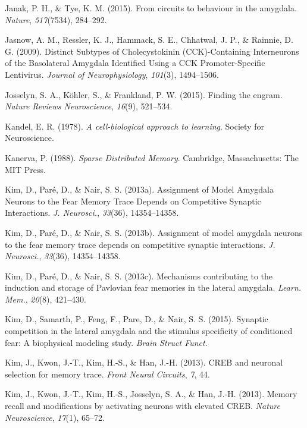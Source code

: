 \documentclass[12pt,a4paper,]{report}
\begin{document}
\hypertarget{ref-janakux5fcircuitsux5f2015}{}
Janak, P. H., \& Tye, K. M. (2015). From circuits to behaviour in the
amygdala. \emph{Nature}, \emph{517}(7534), 284--292.

\hypertarget{ref-jasnowux5fdistinctux5f2009}{}
Jasnow, A. M., Ressler, K. J., Hammack, S. E., Chhatwal, J. P., \&
Rainnie, D. G. (2009). Distinct Subtypes of Cholecystokinin
(CCK)-Containing Interneurons of the Basolateral Amygdala Identified
Using a CCK Promoter-Specific Lentivirus. \emph{Journal of
Neurophysiology}, \emph{101}(3), 1494--1506.

\hypertarget{ref-josselynux5ffindingux5f2015}{}
Josselyn, S. A., Köhler, S., \& Frankland, P. W. (2015). Finding the
engram. \emph{Nature Reviews Neuroscience}, \emph{16}(9), 521--534.

\hypertarget{ref-kandelux5fcell-biologicalux5f1978}{}
Kandel, E. R. (1978). \emph{A cell-biological approach to learning}.
Society for Neuroscience.

\hypertarget{ref-kanervaux5fsparseux5f1988}{}
Kanerva, P. (1988). \emph{Sparse Distributed Memory}. Cambridge,
Massachusetts: The MIT Press.

\hypertarget{ref-kimux5fassignmentux5f2013-1}{}
Kim, D., Paré, D., \& Nair, S. S. (2013a). Assignment of Model Amygdala
Neurons to the Fear Memory Trace Depends on Competitive Synaptic
Interactions. \emph{J. Neurosci.}, \emph{33}(36), 14354--14358.

\hypertarget{ref-kimux5fassignmentux5f2013}{}
Kim, D., Paré, D., \& Nair, S. S. (2013b). Assignment of model amygdala
neurons to the fear memory trace depends on competitive synaptic
interactions. \emph{J. Neurosci.}, \emph{33}(36), 14354--14358.

\hypertarget{ref-kimux5fmechanismsux5f2013-1}{}
Kim, D., Paré, D., \& Nair, S. S. (2013c). Mechanisms contributing to
the induction and storage of Pavlovian fear memories in the lateral
amygdala. \emph{Learn. Mem.}, \emph{20}(8), 421--430.

\hypertarget{ref-kimux5fsynapticux5f2015}{}
Kim, D., Samarth, P., Feng, F., Pare, D., \& Nair, S. S. (2015).
Synaptic competition in the lateral amygdala and the stimulus
specificity of conditioned fear: A biophysical modeling study.
\emph{Brain Struct Funct}.

\hypertarget{ref-kimux5fcrebux5f2013}{}
Kim, J., Kwon, J.-T., Kim, H.-S., \& Han, J.-H. (2013). CREB and
neuronal selection for memory trace. \emph{Front Neural Circuits},
\emph{7}, 44.

\hypertarget{ref-kimux5fmemoryux5f2013}{}
Kim, J., Kwon, J.-T., Kim, H.-S., Josselyn, S. A., \& Han, J.-H. (2013).
Memory recall and modifications by activating neurons with elevated
CREB. \emph{Nature Neuroscience}, \emph{17}(1), 65--72.
\end{document}
